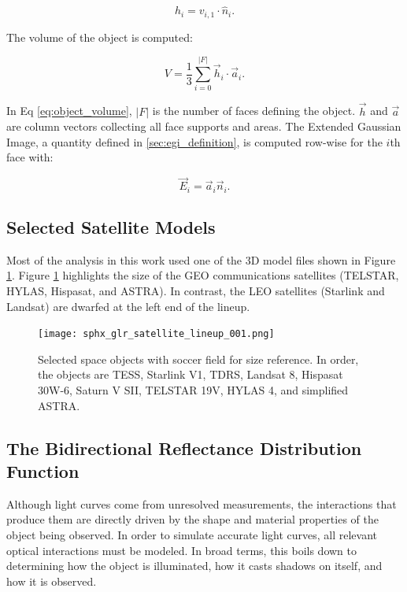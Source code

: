 \begin{equation} \label{eq:face_support}
    h_i = v_{i,1} \cdot \hat{n}_i.
\end{equation}

The volume of the object is computed:

\begin{equation} \label{eq:object_volume}
    V = \frac{1}{3} \sum_{i=0}^{ \lvert F \rvert}\vec{h}_i \cdot \vec{a}_i.
\end{equation}

In Eq \ref{eq:object_volume}, $\lvert F \rvert$ is the number of faces defining the object. $\vec{h}$ and $\vec{a}$ are column vectors collecting all face supports and areas. The Extended Gaussian Image, a quantity defined in \ref{sec:egi_definition}, is computed row-wise for the $i$th face with:

\begin{equation} \label{eq:egi_definition}
    \vec{E}_i = \vec{a}_i \vec{n}_i.
\end{equation}

\subsection{Selected Satellite Models}

Most of the analysis in this work used one of the 3D model files shown in Figure \ref{fig:satellite_lineup}. Figure \ref{fig:satellite_lineup} highlights the size of the GEO communications satellites (TELSTAR, HYLAS, Hispasat, and ASTRA). In contrast, the LEO satellites (Starlink and Landsat) are dwarfed at the left end of the lineup.

\begin{figure}[ht]
    \centering
    \texttt{[image: sphx\_glr\_satellite\_lineup\_001.png]}
    \caption{Selected space objects with soccer field for size reference. In order, the objects are TESS, Starlink V1, TDRS, Landsat 8, Hispasat 30W-6, Saturn V SII, TELSTAR 19V, HYLAS 4, and simplified ASTRA.
    }
    \label{fig:satellite_lineup}
\end{figure}

\subsection{The Bidirectional Reflectance Distribution Function}

Although light curves come from unresolved measurements, the interactions that produce them are directly driven by the shape and material properties of the object being observed. In order to simulate accurate light curves, all relevant optical interactions must be modeled. In broad terms, this boils down to determining how the object is illuminated, how it casts shadows on itself, and how it is observed. 

